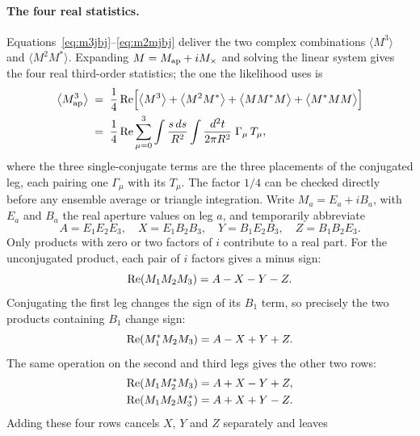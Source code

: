\documentclass[11pt]{article}
\newcommand{\Map}{M_{\rm ap}}
\newcommand{\Mx}{M_{\times}}
\numberwithin{equation}{section}
\begin{document}
\paragraph{The four real statistics.}
Equations~\eqref{eq:m3jbj}--\eqref{eq:m2mjbj} deliver the two
complex combinations $\langle M^3\rangle$ and
$\langle M^2 M^*\rangle$.  Expanding $M = \Map + i\Mx$ and solving
the linear system gives the four real third-order statistics; the
one the likelihood uses is
\begin{equation}
\begin{split}
  \bigl\langle \Map^3 \bigr\rangle
  &\;=\; \frac{1}{4}\,{\rm Re}\Bigl[
  \bigl\langle M^3 \bigr\rangle
  + \bigl\langle M^2 M^{*} \bigr\rangle
  + \bigl\langle M M^{*} M \bigr\rangle
  + \bigl\langle M^{*} M M \bigr\rangle
  \Bigr] \\
  &\;=\; \frac{1}{4}\,{\rm Re}
  \sum_{\mu=0}^{3}
  \int \frac{s\,ds}{R^2} \int \frac{d^2 t}{2\pi R^2}\;
  \Gamma_\mu\, T_\mu ,
\end{split}
  \label{eq:map3sas}
\end{equation}
where the three single-conjugate terms are the three placements of
the conjugated leg, each pairing one $\Gamma_\mu$ with its $T_\mu$.
The factor $1/4$ can be checked directly before any ensemble average
or triangle integration. Write $M_a=E_a+iB_a$, with $E_a$ and $B_a$ the
real aperture values on leg $a$, and temporarily abbreviate
\begin{equation}
 A=E_1E_2E_3,\quad X=E_1B_2B_3,\quad
 Y=B_1E_2B_3,\quad Z=B_1B_2E_3.
\end{equation}
Only products with zero or two factors of $i$ contribute to a real part.
For the unconjugated product, each pair of $i$ factors gives a minus sign:
\begin{equation}
 {\rm Re}(M_1M_2M_3)=A-X-Y-Z.
\end{equation}
Conjugating the first leg changes the sign of its $B_1$ term, so precisely
the two products containing $B_1$ change sign:
\begin{equation}
 {\rm Re}(M_1^*M_2M_3)=A-X+Y+Z.
\end{equation}
The same operation on the second and third legs gives the other two rows:
\begin{equation}
\begin{aligned}
 {\rm Re}(M_1M_2^*M_3)&=A+X-Y+Z,\\
 {\rm Re}(M_1M_2M_3^*)&=A+X+Y-Z.
\end{aligned}
\end{equation}
Adding these four rows cancels $X$, $Y$ and $Z$ separately and leaves
\end{document}
